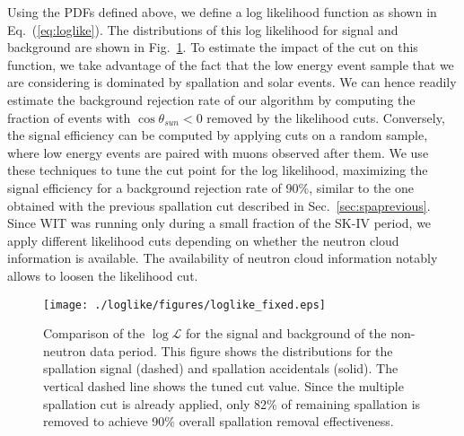 Using the PDFs defined above, we define a log likelihood function as shown in Eq.~(\ref{eq:loglike}). The distributions of this log likelihood for signal and background are shown in Fig.~\ref{fig:loglike}. To estimate the impact of the cut on this function, we take advantage of the fact that the low energy event sample that we are considering is dominated by spallation and solar events. We can hence readily estimate the background rejection rate of our algorithm by computing the fraction of events with $\cos\theta_{sun}<0$ removed by the likelihood cuts. Conversely, the signal efficiency can be computed by applying cuts on a random sample, where low energy events are paired with muons observed after them. We use these techniques to tune the cut point for the log likelihood, maximizing the signal efficiency for a background rejection rate of 90\%, similar to the one obtained with the previous spallation cut described in Sec.~\ref{sec:spaprevious}. Since WIT was running only during a small fraction of the SK-IV period, we apply different likelihood cuts depending on whether the neutron cloud information is available. The availability of neutron cloud information notably allows to loosen the likelihood cut. 

\begin{figure}
    \centering
    \texttt{[image: ./loglike/figures/loglike\_fixed.eps]}
    \caption{Comparison of the $\log\mathcal{L}$ for the signal and background of the non-neutron data period. This figure shows the distributions for the spallation signal (dashed) and spallation accidentals (solid). The vertical dashed line shows the tuned cut value. Since the multiple spallation cut is already applied, only 82\% of remaining spallation is removed to achieve 90\% overall spallation removal effectiveness.}
    \label{fig:loglike}
\end{figure}